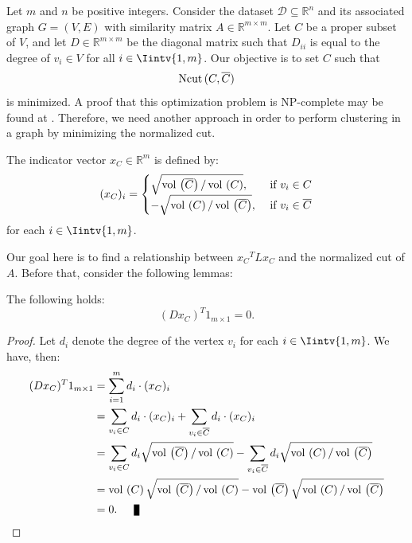 Let $m$ and $n$ be positive integers. 
Consider the dataset $\mathcal D \subseteq \mathbb R ^{n }$ and its associated graph $G = (V,E)$ with similarity matrix $A \in \mathbb R^{m \times m}$.
Let $C$ be a proper subset of $V$, and let $D \in \mathbb R ^{m \times m}$ be the diagonal matrix such that $D_{ii}$ is equal to the degree of $v_i \in V$ for all $i \in \Iintv{1,m}$.
Our objective is to set $C$ such that 
\begin{equation}
   \operatorname*{Ncut\,} (C, \overline C)
\end{equation}
is minimized.
A proof that this optimization problem is NP-complete may be found at \cite{normalized}. 
Therefore, we need another approach in order to perform clustering in a graph by minimizing the normalized cut.

\begin{definition}
The indicator vector $x_C \in \mathbb R ^{m }$ is defined by:
   \begin{equation} \label{indicator}
   (x_C)_i =
   \begin{cases}
      \sqrt{ \operatorname*{vol\,}  \left( \overline C \right) / \operatorname*{vol\,} \left( C \right) }, &\text{ if } v_i \in C \\
      -\sqrt{\operatorname*{vol\,} \left( C \right) / \operatorname*{vol\,} \left( \overline C \right)}, & \text{ if } v_i \in \overline C 
   \end{cases}
\end{equation}
for each $i \in \Iintv{1,m}$.
\end{definition}

Our goal here is to find a relationship between ${x_C}^T L x_C$ and the normalized cut of $A$.
Before that, consider the following lemmas:

\begin{lemma} \label{cond1}
   The following holds:
   \begin{equation}
      (D x_C)^T 1_{m \times 1} = 0.
   \end{equation}
\end{lemma}

\begin{proof}
   Let $d_i$ denote the degree of the vertex $v_i$ for each $i \in \Iintv{1,m}$. We have, then:
   \begin{equation*}
      \begin{split}
         (D x_C)^T 1_{m \times 1} &= \sum_{i=1}^m d_i \cdot (x_C)_i \\
         &= \sum_{v_i \in C} d_i \cdot (x_C)_i + \sum_{v_i \in \overline C} d_i \cdot (x_C)_i \\
         &= \sum_{v_i \in C} d_i \sqrt{\vol \left( \overline C \right) / \vol \left( C \right) } - \sum_{v_i \in \overline C} d_i \sqrt{\vol \left( C \right) / \vol \left( \overline C \right) } \\
         &= \vol \left( C \right) \sqrt{\vol \left( \overline C \right) / \vol \left( C \right) } - \vol \left( \overline C \right) \sqrt{\vol \left( C \right) / \vol \left( \overline C \right) } \\
         &= 0. \qed
      \end{split}
   \end{equation*}
\end{proof}

